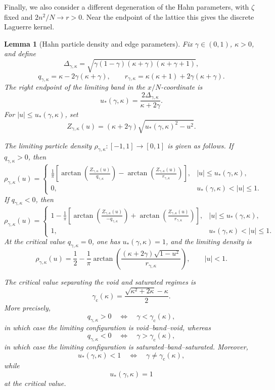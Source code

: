\documentclass[reqno,11pt]{amsart}
\theoremstyle{plain}
\newtheorem{lemma}[thm]{Lemma}
\theoremstyle{definition}
\numberwithin{equation}{section}
\begin{document}
Finally, we also consider a different degeneration of the Hahn parameters, with $\zeta$ fixed and $2n^2/N\to r>0$. Near the endpoint of the lattice this gives the discrete Laguerre kernel.
\begin{lemma}[Hahn particle density and edge parameters]
\label{lem:Hahn_edge_parameters}
Fix $\gamma\in(0,1)$, $\kappa>0$,  and define
\[
\Delta_{\gamma,\kappa} =
\sqrt{
\gamma(1-\gamma)
(\kappa+\gamma)
(\kappa+\gamma+1)
},
\]
\[
q_{\gamma,\kappa}
=
\kappa-2\gamma(\kappa+\gamma),
\qquad
r_{\gamma,\kappa}
=
\kappa(\kappa+1)+2\gamma(\kappa+\gamma).
\]
The right endpoint of the limiting band in the \(x/N\)-coordinate is
\[
u_{\ast}(\gamma,\kappa)
=
\frac{2\Delta_{\gamma,\kappa}}{\kappa+2\gamma}.
\]
For \(\lvert u\rvert\leq u_{\ast}(\gamma,\kappa)\), set
\[
Z_{\gamma,\kappa}(u)
=
(\kappa+2\gamma)
\sqrt{u_{\ast}(\gamma,\kappa)^2-u^2}.
\]

The limiting particle density
\(\rho_{\gamma,\kappa}\colon[-1,1]\to[0,1]\) is given as follows.
If \(q_{\gamma,\kappa}>0\), then
\[
\rho_{\gamma,\kappa}(u)
=
\begin{cases}
\displaystyle
\frac{1}{\pi}
\left[
\arctan\left(
\frac{Z_{\gamma,\kappa}(u)}
{q_{\gamma,\kappa}}
\right)
-
\arctan\left(
\frac{Z_{\gamma,\kappa}(u)}
{r_{\gamma,\kappa}}
\right)
\right],
&
\lvert u\rvert\leq u_{\ast}(\gamma,\kappa),
\\[1.4em]
0,
&
u_{\ast}(\gamma,\kappa)<\lvert u\rvert\leq 1.
\end{cases}
\]
If \(q_{\gamma,\kappa}<0\), then
\[
\rho_{\gamma,\kappa}(u)
=
\begin{cases}
\displaystyle
1-
\frac{1}{\pi}
\left[
\arctan\left(
\frac{Z_{\gamma,\kappa}(u)}
{-q_{\gamma,\kappa}}
\right)
+
\arctan\left(
\frac{Z_{\gamma,\kappa}(u)}
{r_{\gamma,\kappa}}
\right)
\right],
&
\lvert u\rvert\leq u_{\ast}(\gamma,\kappa),
\\[1.4em]
1,
&
u_{\ast}(\gamma,\kappa)<\lvert u\rvert\leq 1.
\end{cases}
\]
At the critical value \(q_{\gamma,\kappa}=0\), one has
\(u_{\ast}(\gamma,\kappa)=1\), and the limiting density is
\[
\rho_{\gamma,\kappa}(u)
=
\frac{1}{2}
-
\frac{1}{\pi}
\arctan\left(
\frac{
(\kappa+2\gamma)\sqrt{1-u^2}
}{
r_{\gamma,\kappa}
}
\right),
\qquad
\lvert u\rvert<1.
\]

The critical value separating the void and saturated regimes is
\[
\gamma_{\mathrm c}(\kappa)
=
\frac{\sqrt{\kappa^2+2\kappa}-\kappa}{2}.
\]
More precisely,
\[
q_{\gamma,\kappa}>0
\quad\Longleftrightarrow\quad
\gamma<\gamma_{\mathrm c}(\kappa),
\]
in which case the limiting configuration is
void--band--void, whereas
\[
q_{\gamma,\kappa}<0
\quad\Longleftrightarrow\quad
\gamma>\gamma_{\mathrm c}(\kappa),
\]
in which case the limiting configuration is
saturated--band--saturated. Moreover,
\[
u_{\ast}(\gamma,\kappa)<1
\quad\Longleftrightarrow\quad
\gamma\neq\gamma_{\mathrm c}(\kappa),
\]
while
\[
u_{\ast}(\gamma,\kappa)=1
\]
at the critical value.


\end{lemma}
\end{document}
